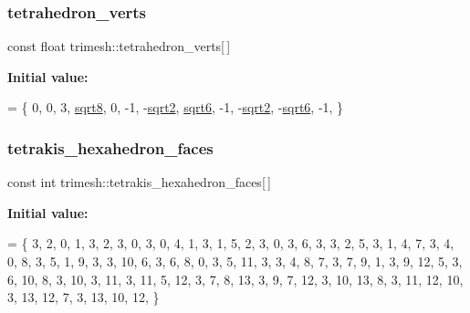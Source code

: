 \subsubsection{\texorpdfstring{tetrahedron\+\_\+verts}{tetrahedron\_verts}}
{\footnotesize\ttfamily const float trimesh\+::tetrahedron\+\_\+verts\mbox{[}$\,$\mbox{]}\hspace{0.3cm}{\ttfamily [static]}}

{\bfseries Initial value\+:}
\begin{DoxyCode}
= \{
    0, 0, 3,
    \hyperlink{namespacetrimesh_a8b4b9b07d9f3a19420d9c1c642d9c514}{sqrt8}, 0, -1,
    -\hyperlink{namespacetrimesh_a21b7083db6f31938db0a1978b55f9899}{sqrt2}, \hyperlink{namespacetrimesh_a3173b214bdbe05cf868a3d263a3cf29c}{sqrt6}, -1,
    -\hyperlink{namespacetrimesh_a21b7083db6f31938db0a1978b55f9899}{sqrt2}, -\hyperlink{namespacetrimesh_a3173b214bdbe05cf868a3d263a3cf29c}{sqrt6}, -1,
\}
\end{DoxyCode}
\mbox{\label{namespacetrimesh_aa22cbab798d42256098ee19b9e0ec1d5}} 
\subsubsection{\texorpdfstring{tetrakis\+\_\+hexahedron\+\_\+faces}{tetrakis\_hexahedron\_faces}}
{\footnotesize\ttfamily const int trimesh\+::tetrakis\+\_\+hexahedron\+\_\+faces\mbox{[}$\,$\mbox{]}\hspace{0.3cm}{\ttfamily [static]}}

{\bfseries Initial value\+:}
\begin{DoxyCode}
= \{
    3, 2, 0, 1,
    3, 2, 3, 0,
    3, 0, 4, 1,
    3, 1, 5, 2,
    3, 0, 3, 6,
    3, 3, 2, 5,
    3, 1, 4, 7,
    3, 4, 0, 8,
    3, 5, 1, 9,
    3, 3, 10, 6,
    3, 6, 8, 0,
    3, 5, 11, 3,
    3, 4, 8, 7,
    3, 7, 9, 1,
    3, 9, 12, 5,
    3, 6, 10, 8,
    3, 10, 3, 11,
    3, 11, 5, 12,
    3, 7, 8, 13,
    3, 9, 7, 12,
    3, 10, 13, 8,
    3, 11, 12, 10,
    3, 13, 12, 7,
    3, 13, 10, 12,
\}
\end{DoxyCode}
\mbox{\label{namespacetrimesh_a1c3854c783d47b1a06dd4ce8077a0043}} 
